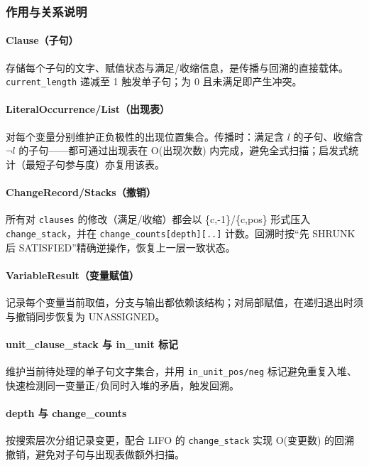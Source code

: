\documentclass[UTF8]{ctexart}
\begin{document}
\subsubsection{作用与关系说明}
\paragraph{Clause（子句）} 存储每个子句的文字、赋值状态与满足/收缩信息，是传播与回溯的直接载体。\texttt{current\_length} 递减至 1 触发单子句；为 0 且未满足即产生冲突。

\paragraph{LiteralOccurrence/List（出现表）} 对每个变量分别维护正负极性的出现位置集合。传播时：满足含 \(l\) 的子句、收缩含 \(\lnot l\) 的子句——都可通过出现表在 O(出现次数) 内完成，避免全式扫描；启发式统计（最短子句参与度）亦复用该表。

\paragraph{ChangeRecord/Stacks（撤销）} 所有对 \texttt{clauses} 的修改（满足/收缩）都会以 \{c,-1\}/\{c,pos\} 形式压入 \texttt{change\_stack}，并在 \texttt{change\_counts[depth][..]} 计数。回溯时按“先 SHRUNK 后 SATISFIED”精确逆操作，恢复上一层一致状态。

\paragraph{VariableResult（变量赋值）} 记录每个变量当前取值，分支与输出都依赖该结构；对局部赋值，在递归退出时须与撤销同步恢复为 UNASSIGNED。

\paragraph{unit\_clause\_stack 与 in\_unit 标记} 维护当前待处理的单子句文字集合，并用 \texttt{in\_unit\_pos/neg} 标记避免重复入堆、快速检测同一变量正/负同时入堆的矛盾，触发回溯。

\paragraph{depth 与 change\_counts} 按搜索层次分组记录变更，配合 LIFO 的 \texttt{change\_stack} 实现 O(变更数) 的回溯撤销，避免对子句与出现表做额外扫描。
\end{document}
